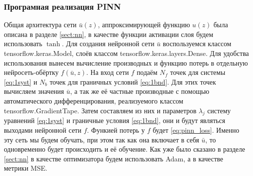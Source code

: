 \documentclass[a4paper,14pt]{extarticle} %
\begin{document}
\subsubsection{Програмная реализация PINN}


Общая архитектура сети $\bar{u}(z)$, аппроксимирующей функцию $u(z)$ была описана в разделе \ref{sect:nn}, в качестве функции активации слоя будем использовать $\tanh$. Для создания нейронной сети $\bar{u}$ воспользуемся классом tensorflow.keras.Model, слоёв классом tensorflow.keras.layers.Dense. Для удобства использования вынесем вычисление производных и функцию потерь в отдельную нейросеть-обёртку $f(\bar{u}, z)$. На вход сети $f$ подаём $N_f$ точек для системы \eqref{eq:1syst} и $N_b$ точек для граничных условий \eqref{eq:1bnd}. Для этих точек вычисляем значения $\bar{u}$, а так же её частные производные с помощью автоматического дифференцирования, реализуемого классом tensorflow.GradientTape. Затем составляем из них и параметров $\lambda_j$ систему уравнений \eqref{eq:1syst} и граничные условия \eqref{eq:1bnd}, они и будут являться выходами нейронной сети $f$. Функией потерь у $f$ будет \eqref{eq:pinn_loss}. Именно эту сеть мы будем обучать, при этом так как она включает в себя $\bar{u}$, то одновременно будет происходить и её обучение. Как уже было сказано в разделе \ref{sect:nn} в качестве оптимизатора будем использовать Adam, а в качестве метрики MSE.

\end{document}
